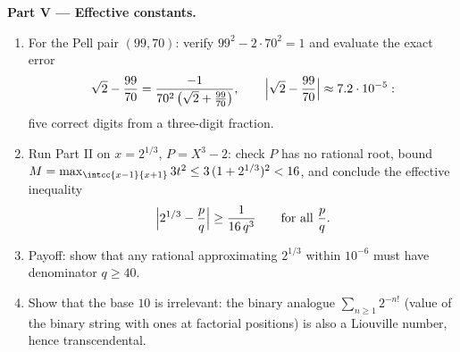 \begin{problem}
\medskip
\noindent\textbf{Part V --- Effective constants.}
\begin{enumerate}[resume]
  \item For the Pell pair $(99, 70)$: verify $99^2 - 2\cdot70^2
        = 1$ and evaluate the exact error
        \[
        \sqrt2 - \frac{99}{70}
        = \frac{-1}{70^2\,\bigl(\sqrt2 + \frac{99}{70}\bigr)},
        \qquad
        \Bigl|\sqrt 2 - \frac{99}{70}\Bigr| \approx 7.2\cdot
        10^{-5} :
        \]
        five correct digits from a three-digit fraction.
  \item Run Part II on $x = 2^{1/3}$, $P = X^3 - 2$: check $P$
        has no rational root, bound $M = \max_{\intcc{x-1}{x+1}}
        3t^2 \leq 3\,(1 + 2^{1/3})^2 < 16$, and conclude the
        effective inequality
        \[
        \Bigl| 2^{1/3} - \frac pq \Bigr| \geq
        \frac{1}{16\,q^3} \qquad \text{for all } \frac pq .
        \]
  \item Payoff: show that any rational approximating $2^{1/3}$
        within $10^{-6}$ must have denominator $q \geq 40$.
  \item Show that the base $10$ is irrelevant: the binary
        analogue $\sum_{n\geq1} 2^{-n!}$ (value of the binary
        string with ones at factorial positions) is also a
        Liouville number, hence transcendental.
\end{enumerate}


\end{problem}
